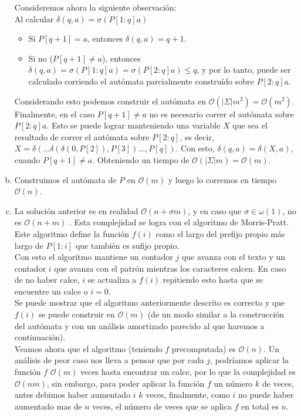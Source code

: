 \documentclass[dcc,uchile]{fcfmcourse}
\theoremstyle{plain}
\theoremstyle{definition}
\begin{document}
\begin{problems}
\begin{enumerate}[a)]
    Consideremos ahora la siguiente observación:\\
    
    Al calcular $\delta(q,a) = \sigma(P[1:q]a)$
    \begin{itemize}
        \item Si $P[q+1] = a$, entonces $\delta(q,a) = q+1$.
        \item Si no ($P[q+1] \not= a$), entonces $\delta(q,a) = \sigma(P[1:q]a) = \sigma(P[2:q]a) \le q$, y por lo tanto, puede ser calculado corriendo el autómata parcialmente construído sobre $P[2:q]a$.
    \end{itemize}
    Considerando esto podemos construir el autómata en $\mathcal{O}(|\Sigma|m^2) = \mathcal{O}(m^2)$.\\
    
    
    Finalmente, en el caso $P[q+1] \not= a$ no es necesario correr el autómata sobre $P[2:q]a$. Esto se puede lograr manteniendo una variable $X$ que sea el resultado de correr el autómata sobre $P[2:q]$, es decir, $X = \delta(\ldots\delta(\delta(0, P[2]), P[3])\ldots , P[q])$. Con esto, $\delta(q, a) = \delta(X, a)$, cuando $P[q+1] \not= a$. Obteniendo un tiempo de $\mathcal{O}(|\Sigma|m) = \mathcal{O}(m)$.
    \item Construimos el autómata de $P$ en $\mathcal{O}(m)$ y luego lo corremos en tiempo $\mathcal{O}(n)$.
    \item La solución anterior es en realidad $\mathcal{O}(n + \sigma m)$, y en caso que $\sigma \in \omega(1)$, no es $\mathcal{O}(n+m)$ . Esta complejidad se logra con el algoritmo de Morris-Pratt. Este algoritmo define la función $f(i)$ como el largo del prefijo propio más largo de $P[1:i]$ que también es sufijo propio.\\
    
    Con esto el algoritmo mantiene un contador $j$ que avanza con el texto y un contador $i$ que avanza con el patrón mientras los caracteres calcen. En caso de no haber calce, $i$ se actualiza a $f(i)$ repitiendo esto hasta que se encuentre un calce o $i=0$.\\
    
    Se puede mostrar que el algoritmo anteriormente descrito es correcto y que $f(i)$ se puede construir en $\mathcal{O}(m)$ (de un modo similar a la construcción del autómata y con un análisis amortizado parecido al que haremos a continuación).\\
    
    Veamos ahora que el algoritmo (teniendo $f$ precomputada) es $\mathcal{O}(n)$. Un análisis de peor caso nos lleva a pensar que por cada $j$, podríamos aplicar la función $f$ $\mathcal{O}(m)$ veces hasta encontrar un calce, por lo que la complejidad es $\mathcal{O}(nm)$, sin embargo, para poder aplicar la función $f$ un número $k$ de veces, antes debimos haber aumentado $i$ $k$ veces, finalmente, como $i$ no puede haber aumentado mas de $n$ veces, el número de veces que se aplica $f$ en total es $n$.
\end{enumerate}
\end{problems}
\end{document}
